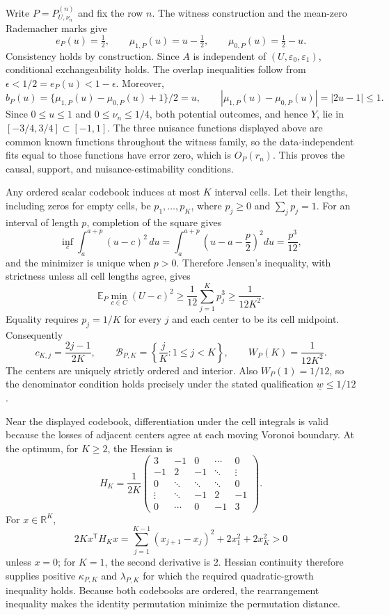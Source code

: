 Write \(P=P_{U,\nu_n}^{(n)}\) and fix the row \(n\).  The witness construction and the mean-zero Rademacher marks give
\[
 e_P(u)=\tfrac12,\qquad
 \mu_{1,P}(u)=u-\tfrac12,\qquad
 \mu_{0,P}(u)=\tfrac12-u .
\]
Consistency holds by construction.  Since \(A\) is independent of \((U,\varepsilon_0,\varepsilon_1)\), conditional exchangeability holds.  The overlap inequalities follow from \(\epsilon<1/2=e_P(u)<1-\epsilon\).  Moreover,
\[
 b_P(u)=\{\mu_{1,P}(u)-\mu_{0,P}(u)+1\}/2=u,
 \qquad |\mu_{1,P}(u)-\mu_{0,P}(u)|=|2u-1|\leq1.
\]
Since \(0\leq u\leq1\) and \(0\leq\nu_n\leq1/4\), both potential outcomes, and hence \(Y\), lie in \([-3/4,3/4]\subset[-1,1]\).  The three nuisance functions displayed above are common known functions throughout the witness family, so the data-independent fits equal to those functions have error zero, which is \(O_P(r_n)\).  This proves the causal, support, and nuisance-estimability conditions.

Any ordered scalar codebook induces at most \(K\) interval cells.  Let their lengths, including zeros for empty cells, be \(p_1,\ldots,p_K\), where \(p_j\geq0\) and \(\sum_jp_j=1\).  For an interval of length \(p\), completion of the square gives
\[
 \inf_c\int_a^{a+p}(u-c)^2\,du
 =\int_a^{a+p}\left(u-a-\frac p2\right)^2du
 =\frac{p^3}{12},
\]
and the minimizer is unique when \(p>0\).  Therefore Jensen's inequality, with strictness unless all cell lengths agree, gives
\[
 \mathbb E_P\min_{c\in C}(U-c)^2
 \geq \frac1{12}\sum_{j=1}^Kp_j^3
 \geq\frac1{12K^2}.
\]
Equality requires \(p_j=1/K\) for every \(j\) and each center to be its cell midpoint.  Consequently
\[
 c_{K,j}=\frac{2j-1}{2K},\qquad
 \mathcal B_{P,K}=\left\{\frac jK:1\leq j<K\right\},
 \qquad W_P(K)=\frac1{12K^2}.
\]
The centers are uniquely strictly ordered and interior.  Also \(W_P(1)=1/12\), so the denominator condition holds precisely under the stated qualification \(\underline w\leq1/12\).

Near the displayed codebook, differentiation under the cell integrals is valid because the losses of adjacent centers agree at each moving Voronoi boundary.  At the optimum, for \(K\geq2\), the Hessian is
\[
 H_K=\frac1{2K}
 \begin{pmatrix}
 3&-1&0&\cdots&0\\
 -1&2&-1&\ddots&\vdots\\
 0&\ddots&\ddots&\ddots&0\\
 \vdots&\ddots&-1&2&-1\\
 0&\cdots&0&-1&3
 \end{pmatrix}.
\]
For \(x\in\mathbb R^K\),
\[
 2Kx^{\mathsf T}H_Kx
 =\sum_{j=1}^{K-1}(x_{j+1}-x_j)^2+2x_1^2+2x_K^2>0
\]
unless \(x=0\); for \(K=1\), the second derivative is \(2\).  Hessian continuity therefore supplies positive \(\kappa_{P,K}\) and \(\lambda_{P,K}\) for which the required quadratic-growth inequality holds.  Because both codebooks are ordered, the rearrangement inequality makes the identity permutation minimize the permutation distance.

